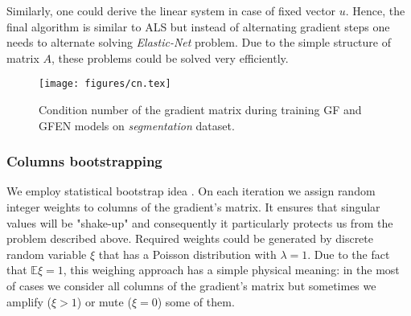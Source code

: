 \documentclass{article}
\begin{document}
Similarly, one could derive the linear system in case of fixed vector $u$. Hence, the final algorithm is similar to ALS but instead of alternating gradient steps one needs to alternate solving \emph{Elastic-Net} problem. Due to the simple structure of matrix $A$, these problems could be solved very efficiently.

\begin{figure}
\vskip 0.2in
\begin{center}
\centerline{\texttt{[image: figures/cn.tex]}}
\caption{Condition number of the gradient matrix during training GF and GFEN models on \emph{segmentation} dataset.}
\end{center}
\vskip -0.2in
\end{figure}

\subsubsection{Columns bootstrapping}
We employ statistical bootstrap idea \cite{Efron1992bootstrap}. On each iteration we assign random integer weights to columns of the gradient's matrix. It ensures that singular values will be "shake-up" and consequently it particularly protects us from the problem described above. Required weights could be generated by discrete random variable $\xi$ that has a Poisson distribution with $\lambda = 1$. Due to the fact that $\mathbb{E} \xi = 1$, this weighing approach has a simple physical meaning: in the most of cases we consider all columns of the gradient's matrix but sometimes we amplify ($\xi > 1$) or mute ($\xi = 0$) some of them.
\end{document}
